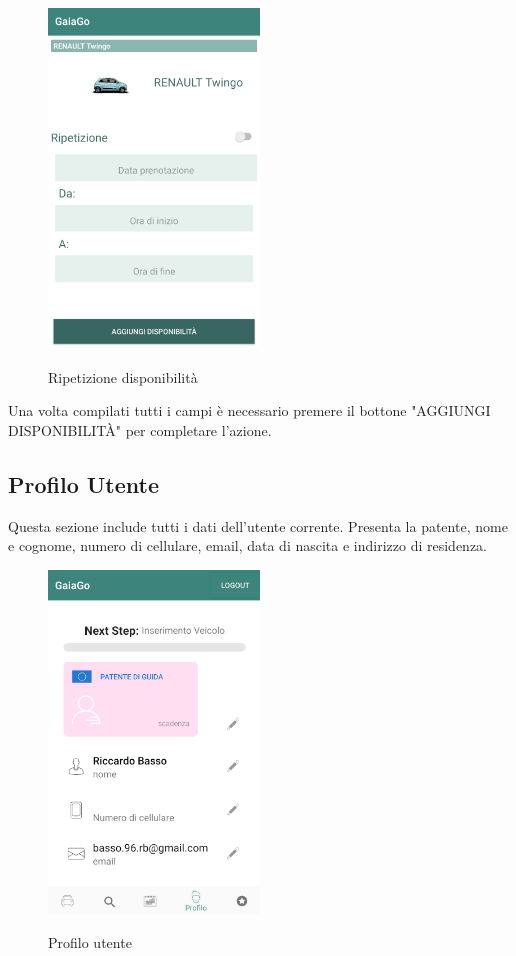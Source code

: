  \begin{figure}[H] 
	\centering 
	\includegraphics[width=0.5\textwidth]{res/images/aggiungi_disponibilita2.png}\\
	\caption{Ripetizione disponibilità}
	\label{disponibilità2}
\end{figure}
Una volta compilati tutti i campi è necessario premere il bottone "AGGIUNGI DISPONIBILITÀ" per completare l'azione.
\pagebreak

\subsection{Profilo Utente}
Questa sezione include tutti i dati dell'utente corrente. Presenta la patente, nome e cognome, numero di cellulare, email, data di nascita e indirizzo di residenza.
 \begin{figure}[H] 
	\centering 
	\includegraphics[width=0.5\textwidth]{res/images/profilo_utente.png}\\
	\caption{Profilo utente}
	\label{profilo}
\end{figure}
\pagebreak

